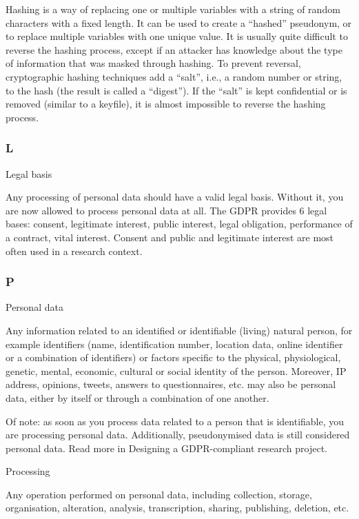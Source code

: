 \documentclass[
]{book}
\begin{document}
Hashing is a way of replacing one or multiple variables with a string of
random characters with a fixed length. It can be used to create a ``hashed''
pseudonym, or to replace multiple variables with one unique value. It is
usually quite difficult to reverse the hashing process, except if an attacker
has knowledge about the type of information that was masked through hashing.
To prevent reversal, cryptographic hashing techniques add a ``salt'', i.e., a
random number or string, to the hash (the result is called a ``digest''). If
the ``salt'' is kept confidential or is removed (similar to a keyfile), it is
almost impossible to reverse the hashing process.

\hypertarget{l}{%
\subsubsection{L}\label{l}}

Legal basis

Any processing of personal data should have a valid legal basis. Without it, you are now allowed to process personal data at all.
The GDPR provides 6 legal bases: consent, legitimate interest, public interest, legal obligation, performance of a contract, vital
interest. Consent and public and legitimate interest are most often used in a research context.

\hypertarget{p}{%
\subsubsection{P}\label{p}}

Personal data

Any information related to an identified or identifiable (living) natural person, for example identifiers (name, identification number,
location data, online identifier or a combination of identifiers) or factors specific to the physical, physiological, genetic, mental,
economic, cultural or social identity of the person. Moreover, IP address, opinions, tweets, answers to questionnaires, etc. may also be
personal data, either by itself or through a combination of one another.

Of note: as soon as you process data related to a person that is identifiable, you are processing personal data. Additionally,
pseudonymised data is still considered personal data. Read more in Designing a GDPR-compliant research project.

Processing

Any operation performed on personal data, including collection, storage, organisation, alteration, analysis,
transcription, sharing, publishing, deletion, etc.
\end{document}
